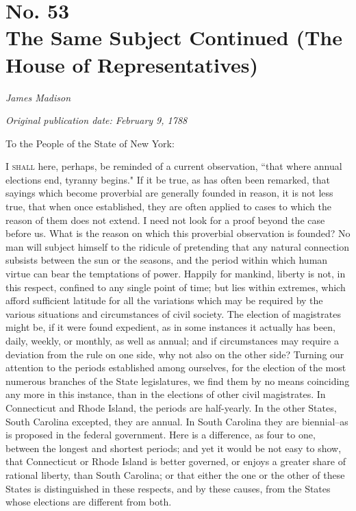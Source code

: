 \chapter[No. 53: The Same Subject Continued (The House of Representatives)]{No. 53\\ {\small The Same Subject Continued (The House of Representatives)}}

\textit{James Madison}

\textit{Original publication date: February 9, 1788}
\vspace{1cm}

To the People of the State of New York:
\vspace{.4cm}

\textsc{I shall} here, perhaps, be reminded of a current observation, ``that where annual elections end, tyranny begins." If it be true, as has often been remarked, that sayings which become proverbial are generally founded in reason, it is not less true, that when once established, they are often applied to cases to which the reason of them does not extend. 
I need not look for a proof beyond the case before us. 
What is the reason on which this proverbial observation is founded? 
No man will subject himself to the ridicule of pretending that any natural connection subsists between the sun or the seasons, and the period within which human virtue can bear the temptations of power. 
Happily for mankind, liberty is not, in this respect, confined to any single point of time; but lies within extremes, which afford sufficient latitude for all the variations which may be required by the various situations and circumstances of civil society. 
The election of magistrates might be, if it were found expedient, as in some instances it actually has been, daily, weekly, or monthly, as well as annual; and if circumstances may require a deviation from the rule on one side, why not also on the other side? 
Turning our attention to the periods established among ourselves, for the election of the most numerous branches of the State legislatures, we find them by no means coinciding any more in this instance, than in the elections of other civil magistrates. 
In Connecticut and Rhode Island, the periods are half-yearly. 
In the other States, South Carolina excepted, they are annual. 
In South Carolina they are biennial--as is proposed in the federal government. 
Here is a difference, as four to one, between the longest and shortest periods; and yet it would be not easy to show, that Connecticut or Rhode Island is better governed, or enjoys a greater share of rational liberty, than South Carolina; or that either the one or the other of these States is distinguished in these respects, and by these causes, from the States whose elections are different from both.

